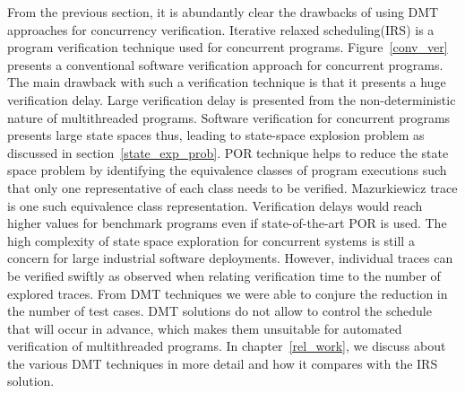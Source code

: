 From the previous section, it is abundantly clear the drawbacks of using DMT approaches for concurrency verification. 
Iterative relaxed scheduling(IRS) is a program verification technique used for concurrent programs. 
Figure~\ref{conv_ver} presents a conventional software verification approach for concurrent programs. 
The main drawback with such a verification technique is that it presents a huge verification delay. 
Large verification delay is presented from the non-deterministic nature of multithreaded programs. 
Software verification for concurrent programs presents large state spaces thus, leading to state-space explosion problem as discussed in section~\ref{state_exp_prob}. 
POR technique helps to reduce the state space problem by identifying the equivalence classes of program executions such that only one representative of each class needs to be verified. 
Mazurkiewicz trace\citep{mazurkiewicz1986trace} is one such equivalence class representation. 
Verification delays would reach higher values for benchmark programs even if state-of-the-art POR is used\citep{abdulla2014optimal}\citep{gueta2007cartesian}. 
The high complexity of state space exploration for concurrent systems is still a concern for large industrial software deployments. 
However, individual traces can be verified swiftly as observed when relating verification time to the number of explored traces. 
From DMT techniques we were able to conjure the reduction in the number of test cases. 
DMT solutions do not allow to control the schedule that will occur in advance, which makes them unsuitable for automated verification of multithreaded programs. 
In chapter~\ref{rel_work}, we discuss about the various DMT techniques in more detail and how it compares with the IRS solution. 

